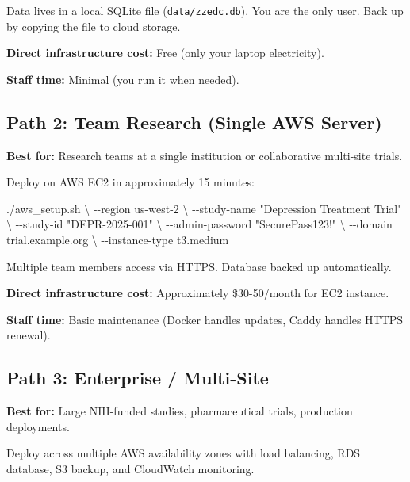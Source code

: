 \documentclass[
  letterpaper,
  DIV=11,
  numbers=noendperiod]{scrartcl}
\newenvironment{Shaded}{\begin{snugshade}}{\end{snugshade}}
\newcommand{\AttributeTok}[1]{\textcolor[rgb]{0.40,0.45,0.13}{#1}}
\newcommand{\DataTypeTok}[1]{\textcolor[rgb]{0.68,0.00,0.00}{#1}}
\newcommand{\ExtensionTok}[1]{\textcolor[rgb]{0.00,0.23,0.31}{#1}}
\newcommand{\NormalTok}[1]{\textcolor[rgb]{0.00,0.23,0.31}{#1}}
\newcommand{\StringTok}[1]{\textcolor[rgb]{0.13,0.47,0.30}{#1}}
\begin{document}
Data lives in a local SQLite file (\texttt{data/zzedc.db}). You are the
only user. Back up by copying the file to cloud storage.

\textbf{Direct infrastructure cost:} Free (only your laptop
electricity).

\textbf{Staff time:} Minimal (you run it when needed).

\subsection{Path 2: Team Research (Single AWS
Server)}\label{path-2-team-research-single-aws-server}

\textbf{Best for:} Research teams at a single institution or
collaborative multi-site trials.

Deploy on AWS EC2 in approximately 15 minutes:

\begin{Shaded}
\begin{Highlighting}[]
\ExtensionTok{./aws\_setup.sh} \DataTypeTok{\textbackslash{}}
  \AttributeTok{{-}{-}region}\NormalTok{ us{-}west{-}2 }\DataTypeTok{\textbackslash{}}
  \AttributeTok{{-}{-}study{-}name} \StringTok{"Depression Treatment Trial"} \DataTypeTok{\textbackslash{}}
  \AttributeTok{{-}{-}study{-}id} \StringTok{"DEPR{-}2025{-}001"} \DataTypeTok{\textbackslash{}}
  \AttributeTok{{-}{-}admin{-}password} \StringTok{"SecurePass123!"} \DataTypeTok{\textbackslash{}}
  \AttributeTok{{-}{-}domain}\NormalTok{ trial.example.org }\DataTypeTok{\textbackslash{}}
  \AttributeTok{{-}{-}instance{-}type}\NormalTok{ t3.medium}
\end{Highlighting}
\end{Shaded}

Multiple team members access via HTTPS. Database backed up
automatically.

\textbf{Direct infrastructure cost:} Approximately \$30-50/month for EC2
instance.

\textbf{Staff time:} Basic maintenance (Docker handles updates, Caddy
handles HTTPS renewal).

\subsection{Path 3: Enterprise /
Multi-Site}\label{path-3-enterprise-multi-site}

\textbf{Best for:} Large NIH-funded studies, pharmaceutical trials,
production deployments.

Deploy across multiple AWS availability zones with load balancing, RDS
database, S3 backup, and CloudWatch monitoring.
\end{document}
